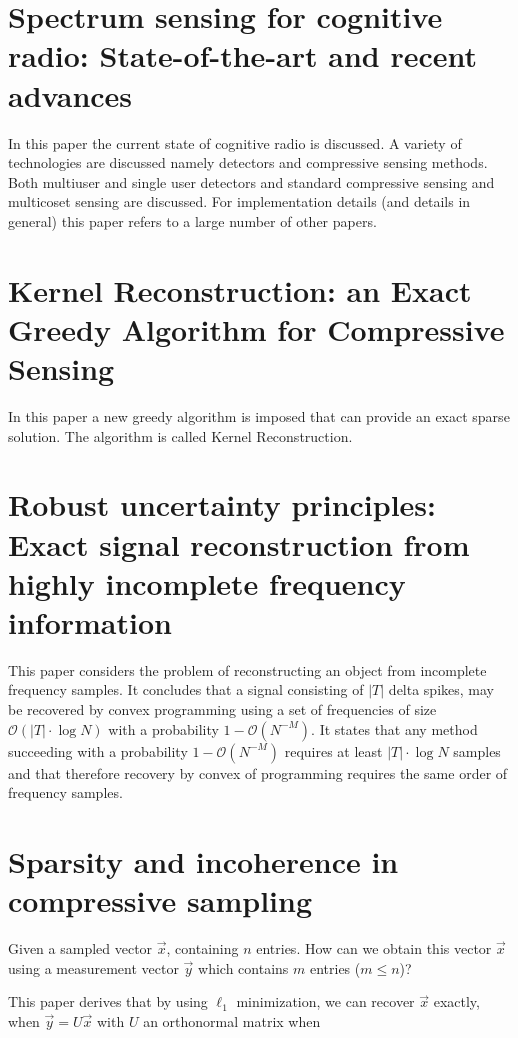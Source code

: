 \documentclass[report, oneside, a4paper, openany]{memoir}
\begin{document}
\section{Spectrum sensing for cognitive radio: State-of-the-art and recent advances \cite{axell2012spectrum}}

In this paper the current state of cognitive radio is discussed. A variety of technologies are discussed namely detectors and compressive sensing methods. Both multiuser and single user detectors and standard compressive sensing and multicoset sensing are discussed. For implementation details (and details in general) this paper refers to a large number of other papers.
\section{Kernel Reconstruction: an Exact Greedy Algorithm for Compressive Sensing \cite{bayarkernel}}

In this paper a new greedy algorithm is imposed that can provide an exact sparse solution. The algorithm is called Kernel Reconstruction.
\section{Robust uncertainty principles: Exact signal reconstruction from highly incomplete frequency information \cite{candes2006robust}}
This paper considers the problem of reconstructing an object from incomplete frequency samples. It concludes that a signal consisting of $|T|$ delta spikes, may be recovered by convex programming using a set of frequencies of size $\mathcal{O}(|T|\cdot \log N)$ with a probability $1-\mathcal{O}(N^{-M})$. It states that any method succeeding with a probability $1-\mathcal{O}(N^{-M})$ requires at least $|T|\cdot \log N$ samples and that therefore recovery by convex of programming requires the same order of frequency samples.
\section{Sparsity and incoherence in compressive sampling \cite{candes2007sparsity}}
%
Given a sampled vector $\vec{x}$, containing $n$ entries. How can we obtain this vector $\vec{x}$ using a measurement vector $\vec{y}$ which contains $m$ entries ($ m \leq n$)?

This paper derives that by using $\ell_1$ minimization, we can recover $\vec{x}$ exactly, when $\vec{y} = U\vec{x}$ with $U$ an orthonormal matrix when
\end{document}
